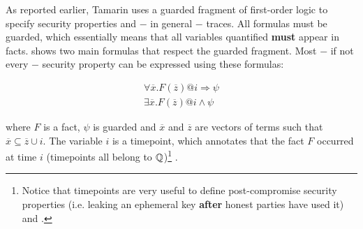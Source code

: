 As reported earlier, Tamarin uses a guarded fragment of first-order logic to specify security properties and $-$ in general $-$ traces. All formulas must be guarded, which essentially means that all variables quantified \textbf{must} appear in facts.  shows two main formulas that respect the guarded fragment. Most $-$ if not every $-$ security property can be expressed using these formulas:

\begin{equation}
  \label{eq:guarded-formulas}
  \begin{gathered}
    \forall \overline{x}. F\left(\overline{z}\right) @i \Rightarrow \psi \\
    \exists \overline{x}. F\left(\overline{z}\right) @i \land \psi
  \end{gathered}
\end{equation}

where $F$ is a fact, $\psi$ is guarded and $\overline{x}$ and $\overline{z}$ are vectors of terms such that $\overline{x} \subseteq \overline{z} \cup i$.
The variable $i$ is a timepoint, which annotates that the fact $F$ occurred at time $i$ (timepoints all belong to $\mathbb{Q}$)\footnote{Notice that timepoints are very useful to define post-compromise security properties (i.e. leaking an ephemeral key \textbf{after} honest parties have used it) and \pfs{}.} \cite{TamarinTeachingSlides}.


